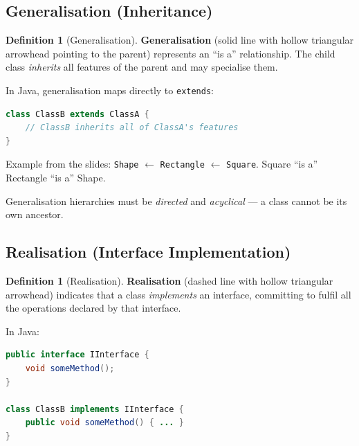 \documentclass[11pt, a4paper, notitlepage]{report}
\theoremstyle{definition}
\newtheorem{definition}[theorem]{Definition}
\theoremstyle{remark}
\theoremstyle{definition}
\begin{document}
\subsection{Generalisation (Inheritance)}
\label{subsec:ch6-generalisation}

\begin{definition}[Generalisation]
\label{def:ch6-generalisation}
\textbf{Generalisation} (solid line with hollow triangular arrowhead pointing
to the parent) represents an ``is a'' relationship.  The child class
\emph{inherits} all features of the parent and may specialise them.
\end{definition}

In Java, generalisation maps directly to \texttt{extends}:

\begin{lstlisting}[language=Java]
class ClassB extends ClassA {
    // ClassB inherits all of ClassA's features
}
\end{lstlisting}

Example from the slides: \texttt{Shape} $\leftarrow$ \texttt{Rectangle}
$\leftarrow$ \texttt{Square}.  Square ``is a'' Rectangle ``is a'' Shape.

Generalisation hierarchies must be \emph{directed} and \emph{acyclical} --- a
class cannot be its own ancestor.

\subsection{Realisation (Interface Implementation)}
\label{subsec:ch6-realisation}

\begin{definition}[Realisation]
\label{def:ch6-realisation}
\textbf{Realisation} (dashed line with hollow triangular arrowhead) indicates
that a class \emph{implements} an interface, committing to fulfil all the
operations declared by that interface.
\end{definition}

In Java:

\begin{lstlisting}[language=Java]
public interface IInterface {
    void someMethod();
}

class ClassB implements IInterface {
    public void someMethod() { ... }
}
\end{lstlisting}
\end{document}
